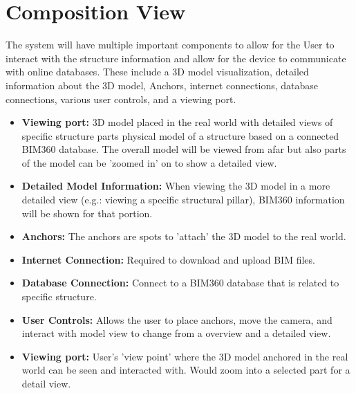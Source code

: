 \documentclass[onecolumn, draftclsnofoot,10pt, compsoc]{IEEEtran}
\begin{document}
\section{Composition View}
The system will have multiple important components to allow for the User to interact with the structure information and allow for the device to communicate with online databases. These include a 3D model visualization, detailed information about the 3D model, Anchors, internet connections, database connections, various user controls, and a viewing port.
\begin{itemize}
    \item \textbf{Viewing port:} 3D model placed in the real world with detailed views of specific structure parts physical model of a structure based on a connected BIM360 database. The overall model will be viewed from afar but also parts of the model can be 'zoomed in' on to show a detailed view.
    \item \textbf{Detailed Model Information:} When viewing the 3D model in a more detailed view (e.g.: viewing a specific structural pillar), BIM360 information will be shown for that portion.
    \item \textbf{Anchors:} The anchors are spots to 'attach' the 3D model to the real world.
    \item \textbf{Internet Connection:} Required to download and upload BIM files.
    \item \textbf{Database Connection:} Connect to a BIM360 database that is related to specific structure.
    \item \textbf{User Controls:} Allows the user to place anchors, move the camera, and interact with model view to change from a overview and a detailed view.
    \item \textbf{Viewing port:} User's 'view point' where the 3D model anchored in the real world can be seen and interacted with. Would zoom into a selected part for a detail view.
\end{itemize}
\end{document}
